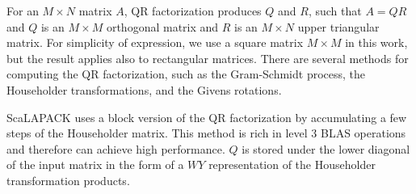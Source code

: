 For an $M\times N$ matrix $A$, QR factorization produces $Q$ and $R$,
such that $A=QR$ and $Q$ is an $M\times M$ orthogonal matrix and $R$
is an $M\times N$ upper triangular matrix.  For simplicity of
expression, we use a square matrix $M\times M$ in this work, but the
result applies also to rectangular matrices. There are several methods
for computing the QR factorization, such as the Gram-Schmidt process,
the Householder transformations, and the Givens rotations. 

ScaLAPACK uses a block version of the QR factorization
by accumulating a few steps of the Householder matrix. This method is
rich in level 3 BLAS operations and therefore can achieve high
performance. $Q$ is stored under the lower diagonal of the input
matrix in the form of a $WY$ representation of the Householder
transformation products\cite{schreiber1989storage, bischof1985wy}.

